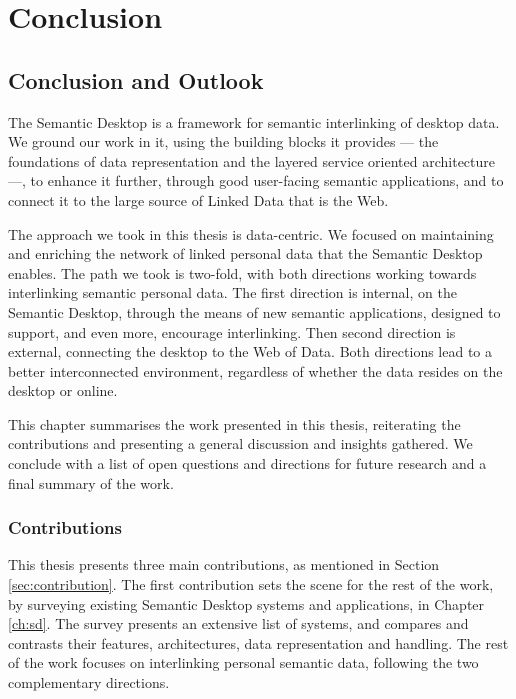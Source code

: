 \part{Conclusion}
\label{part:conclusion}

\chapter{Conclusion and Outlook}
\label{ch:conclusion}

The Semantic Desktop is a framework for semantic interlinking of desktop data. We ground our work in it, using the building blocks it provides --- the foundations of data representation and the layered service oriented architecture ---, to enhance it further, through good user-facing semantic applications, and to connect it to the large source of Linked Data that is the Web.

The approach we took in this thesis is data-centric. We focused on maintaining and enriching the network of linked personal data that the Semantic Desktop enables. The path we took is two-fold, with both directions working towards interlinking semantic personal data. The first direction is internal, on the Semantic Desktop, through the means of new semantic applications, designed to support, and even more, encourage interlinking. Then second direction is external, connecting the desktop to the Web of Data. Both directions lead to a better interconnected environment, regardless of whether the data resides on the desktop or online.

This chapter summarises the work presented in this thesis, reiterating the contributions and presenting a general discussion and insights gathered. We conclude with a list of open questions and directions for future research and a final summary of the work.

\section{Contributions}

This thesis presents three main contributions, as mentioned in Section \ref{sec:contribution}. 
The first contribution sets the scene for the rest of the work, by surveying existing Semantic Desktop systems and applications, in Chapter \ref{ch:sd}. The survey presents an extensive list of systems, and compares and contrasts their features, architectures, data representation and handling.
The rest of the work focuses on interlinking personal semantic data, following the two complementary directions. 

